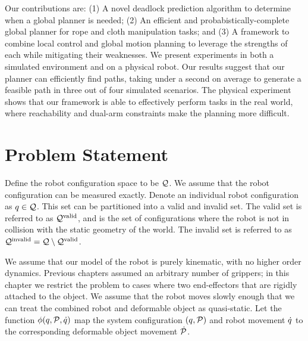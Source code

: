 Our contributions are: (1) A novel deadlock prediction algorithm to determine when a global planner is needed; (2) An efficient and probabistically-complete global planner for rope and cloth manipulation tasks; and (3) A framework to combine local control and global motion planning to leverage the strengths of each while mitigating their weaknesses. We present experiments in both a simulated environment and on a physical robot. Our results suggest that our planner can efficiently find paths, taking under a second on average to generate a feasible path in three out of four simulated scenarios. The physical experiment shows that our framework is able to effectively perform tasks in the real world, where reachability and dual-arm constraints make the planning more difficult.


\section{Problem Statement}
\label{sec:main_problem_statement}

Define the robot configuration space to be $\mathcal{Q}$. We assume that the robot configuration can be measured exactly. Denote an individual robot configuration as $q \in \mathcal{Q}$. This set can be partitioned into a valid and invalid set. The valid set is referred to as $\mathcal{Q}^{\textrm{valid}}$, and is the set of configurations where the robot is not in collision with the static geometry of the world. The invalid set is referred to as $\mathcal{Q}^{\textrm{invalid}} = \mathcal{Q} \setminus \mathcal{Q}^{\textrm{valid}}$.

We assume that our model of the robot is purely kinematic, with no higher order dynamics. Previous chapters assumed an arbitrary number of grippers; in this chapter we restrict the problem to cases where two end-effectors that are rigidly attached to the object. We assume that the robot moves slowly enough that we can treat the combined robot and deformable object as quasi-static. Let the function $\phi(q, \mathcal{P}, \dot{q})$ map the system configuration $(q, \mathcal{P})$ and robot movement $\dot{q}$ to the corresponding deformable object movement $\dot{\mathcal{P}}$.

